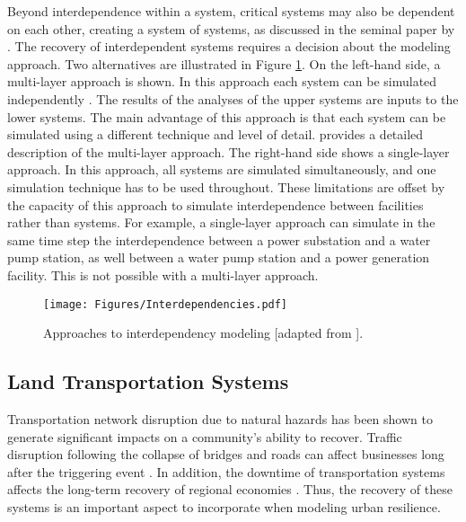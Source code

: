Beyond interdependence within a system, critical systems may also be dependent on each other, creating a system of systems, as discussed in the seminal paper by \citet{rinaldi2001identifying}. The recovery of interdependent systems requires a decision about the modeling approach. Two alternatives are illustrated in Figure \ref{fig:Interdependencies}. On the left-hand side, a multi-layer approach is shown. In this approach each system can be simulated independently \citep{guidotti2017multi}. The results of the analyses of the upper systems are inputs to the lower systems. The main advantage of this approach is that each system can be simulated using a different technique and level of detail. \citet[p.243]{cimellaro2016resilience} provides a detailed description of the multi-layer approach. The right-hand side shows a single-layer approach. In this approach, all systems are simulated simultaneously, and one simulation technique has to be used throughout. These limitations are offset by the capacity of this approach to simulate interdependence between facilities rather than systems. For example, a single-layer approach can simulate in the same time step the interdependence between a power substation and a water pump station, as well between a water pump station and a power generation facility. This is not possible with a multi-layer approach.\ 

\begin{figure}[htb]
    \centering
    \texttt{[image: Figures/Interdependencies.pdf]}
    \caption{Approaches to interdependency modeling [adapted from \citet{cimellaro2016resilience}].}
    \label{fig:Interdependencies}
\end{figure}

\subsection{Land Transportation Systems}
Transportation network disruption due to natural hazards has been shown to generate significant impacts on a community's ability to recover. Traffic disruption following the collapse of bridges and roads can affect businesses long after the triggering event \citep{boarnet1998business}. In addition, the downtime of transportation systems affects the long-term recovery of regional economies \citep{chang2000transportation}. Thus, the recovery of these systems is an important aspect to incorporate when modeling urban resilience. \

